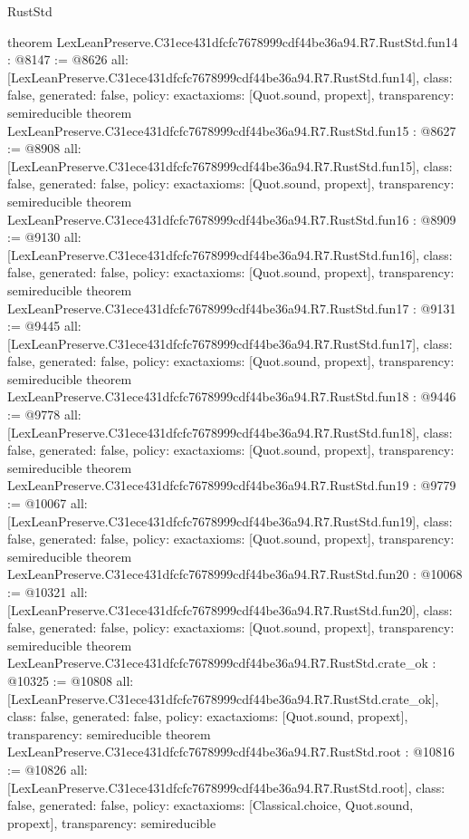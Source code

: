 \begin{lexlean}{RustStd}
\begin{coremodule}
{}
theorem LexLeanPreserve.C31ece431dfcfc7678999cdf44be36a94.R7.RustStd.fun14 : @8147 := @8626 {
  all: [LexLeanPreserve.C31ece431dfcfc7678999cdf44be36a94.R7.RustStd.fun14],
  class: false,
  generated: false,
  policy: exact{axioms: [Quot.sound, propext]},
  transparency: semireducible
}
theorem LexLeanPreserve.C31ece431dfcfc7678999cdf44be36a94.R7.RustStd.fun15 : @8627 := @8908 {
  all: [LexLeanPreserve.C31ece431dfcfc7678999cdf44be36a94.R7.RustStd.fun15],
  class: false,
  generated: false,
  policy: exact{axioms: [Quot.sound, propext]},
  transparency: semireducible
}
theorem LexLeanPreserve.C31ece431dfcfc7678999cdf44be36a94.R7.RustStd.fun16 : @8909 := @9130 {
  all: [LexLeanPreserve.C31ece431dfcfc7678999cdf44be36a94.R7.RustStd.fun16],
  class: false,
  generated: false,
  policy: exact{axioms: [Quot.sound, propext]},
  transparency: semireducible
}
theorem LexLeanPreserve.C31ece431dfcfc7678999cdf44be36a94.R7.RustStd.fun17 : @9131 := @9445 {
  all: [LexLeanPreserve.C31ece431dfcfc7678999cdf44be36a94.R7.RustStd.fun17],
  class: false,
  generated: false,
  policy: exact{axioms: [Quot.sound, propext]},
  transparency: semireducible
}
theorem LexLeanPreserve.C31ece431dfcfc7678999cdf44be36a94.R7.RustStd.fun18 : @9446 := @9778 {
  all: [LexLeanPreserve.C31ece431dfcfc7678999cdf44be36a94.R7.RustStd.fun18],
  class: false,
  generated: false,
  policy: exact{axioms: [Quot.sound, propext]},
  transparency: semireducible
}
theorem LexLeanPreserve.C31ece431dfcfc7678999cdf44be36a94.R7.RustStd.fun19 : @9779 := @10067 {
  all: [LexLeanPreserve.C31ece431dfcfc7678999cdf44be36a94.R7.RustStd.fun19],
  class: false,
  generated: false,
  policy: exact{axioms: [Quot.sound, propext]},
  transparency: semireducible
}
theorem LexLeanPreserve.C31ece431dfcfc7678999cdf44be36a94.R7.RustStd.fun20 : @10068 := @10321 {
  all: [LexLeanPreserve.C31ece431dfcfc7678999cdf44be36a94.R7.RustStd.fun20],
  class: false,
  generated: false,
  policy: exact{axioms: [Quot.sound, propext]},
  transparency: semireducible
}
theorem LexLeanPreserve.C31ece431dfcfc7678999cdf44be36a94.R7.RustStd.crate_ok : @10325 := @10808 {
  all: [LexLeanPreserve.C31ece431dfcfc7678999cdf44be36a94.R7.RustStd.crate_ok],
  class: false,
  generated: false,
  policy: exact{axioms: [Quot.sound, propext]},
  transparency: semireducible
}
theorem LexLeanPreserve.C31ece431dfcfc7678999cdf44be36a94.R7.RustStd.root : @10816 := @10826 {
  all: [LexLeanPreserve.C31ece431dfcfc7678999cdf44be36a94.R7.RustStd.root],
  class: false,
  generated: false,
  policy: exact{axioms: [Classical.choice, Quot.sound, propext]},
  transparency: semireducible
}


\end{coremodule}
\end{lexlean}
